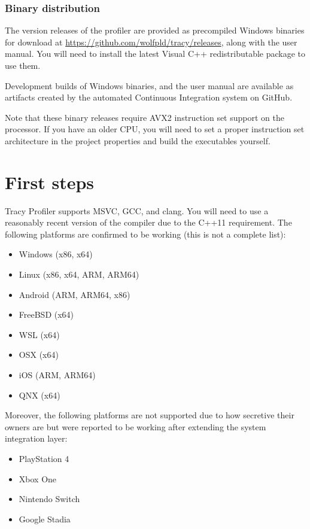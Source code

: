 \documentclass[hidelinks,titlepage,a4paper,twoside]{article}
\begin{document}
\subsubsection{Binary distribution}

The version releases of the profiler are provided as precompiled Windows binaries for download at \url{https://github.com/wolfpld/tracy/releases}, along with the user manual. You will need to install the latest Visual C++ redistributable package to use them.

Development builds of Windows binaries, and the user manual are available as artifacts created by the automated Continuous Integration system on GitHub.

Note that these binary releases require AVX2 instruction set support on the processor. If you have an older CPU, you will need to set a proper instruction set architecture in the project properties and build the executables yourself.

\section{First steps}
\label{firststeps}

Tracy Profiler supports  MSVC, GCC, and clang. You will need to use a reasonably recent version of the compiler due to the C++11 requirement. The following platforms are confirmed to be working (this is not a complete list):

\begin{itemize}
\item Windows (x86, x64)
\item Linux (x86, x64, ARM, ARM64)
\item Android (ARM, ARM64, x86)
\item FreeBSD (x64)
\item WSL (x64)
\item OSX (x64)
\item iOS (ARM, ARM64)
\item QNX (x64)
\end{itemize}

Moreover, the following platforms are not supported due to how secretive their owners are but were reported to be working after extending the system integration layer:

\begin{itemize}
\item PlayStation 4
\item Xbox One
\item Nintendo Switch
\item Google Stadia
\end{itemize}
\end{document}
